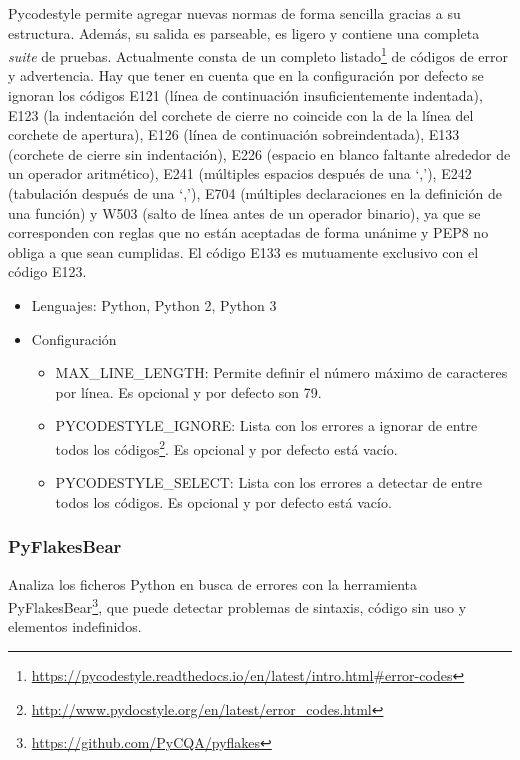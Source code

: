 \documentclass[a4paper, 12pt]{book}
\begin{document}
Pycodestyle permite agregar nuevas normas de forma sencilla gracias a su estructura. Además, su salida es parseable, es ligero y contiene una completa \emph{suite} de pruebas. Actualmente consta de un completo listado\footnote{\url{https://pycodestyle.readthedocs.io/en/latest/intro.html#error-codes}} de códigos de error y advertencia. Hay que tener en cuenta que en la configuración por defecto se ignoran los códigos E121 (línea de continuación insuficientemente indentada), E123 (la indentación del corchete de cierre no coincide con la de la línea del corchete de apertura), E126 (línea de continuación sobreindentada), E133 (corchete de cierre sin indentación), E226 (espacio en blanco faltante alrededor de un operador aritmético), E241 (múltiples espacios después de una `,'), E242 (tabulación después de una `,'), E704 (múltiples declaraciones en la definición de una función) y W503 (salto de línea antes de un operador binario), ya que se corresponden con reglas que no están aceptadas de forma unánime y PEP8 no obliga a que sean cumplidas. El código E133 es mutuamente exclusivo con el código E123.

\begin{itemize}
  \item Lenguajes: Python, Python 2, Python 3
  \item Configuración
    \begin{itemize}
          \item MAX\_LINE\_LENGTH: Permite definir el número máximo de caracteres por línea. Es opcional y por defecto son 79.
          \item PYCODESTYLE\_IGNORE: Lista con los errores a ignorar de entre todos los códigos\footnote{\url{http://www.pydocstyle.org/en/latest/error_codes.html}}. Es opcional y por defecto está vacío.
          \item PYCODESTYLE\_SELECT: Lista con los errores a detectar de entre todos los códigos. Es opcional y por defecto está vacío.
    \end{itemize}
\end{itemize}

\subsubsection{PyFlakesBear}
\label{sec:seccion1.2.8}
Analiza los ficheros Python en busca de errores con la herramienta PyFlakesBear\footnote{\url{https://github.com/PyCQA/pyflakes}}, que puede detectar problemas de sintaxis, código sin uso y elementos indefinidos.
\end{document}
